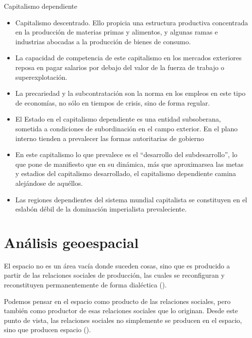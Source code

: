 \documentclass[
  letterpaper,
  DIV=11,
  numbers=noendperiod]{scrreprt}
\begin{document}
Capitalismo dependiente

\begin{itemize}
\item
  Capitalismo descentrado. Ello propicia una estructura productiva
  concentrada en la producción de materias primas y alimentos, y algunas
  ramas e industrias abocadas a la producción de bienes de consumo.
\item
  La capacidad de competencia de este capitalismo en los mercados
  exteriores reposa en pagar salarios por debajo del valor de la fuerza
  de trabajo o superexplotación.
\item
  La precariedad y la subcontratación son la norma en los empleos en
  este tipo de economías, no sólo en tiempos de crisis, sino de forma
  regular.
\item
  El Estado en el capitalismo dependiente es una entidad subsoberana,
  sometida a condiciones de subordinación en el campo exterior. En el
  plano interno tienden a prevalecer las formas autoritarias de gobierno
\item
  En este capitalismo lo que prevalece es el ``desarrollo del
  subdesarrollo'', lo que pone de manifiesto que en su dinámica, más que
  aproximarsea las metas y estadios del capitalismo desarrollado, el
  capitalismo dependiente camina alejándose de aquéllos.
\item
  Las regiones dependientes del sistema mundial capitalista se
  constituyen en el eslabón débil de la dominación imperialista
  prevaleciente.
\end{itemize}

\chapter{Análisis geoespacial}\label{anuxe1lisis-geoespacial}

El espacio no es un área vacía donde suceden cosas, sino que es
producido a partir de las relaciones sociales de producción, las cuales
se reconfiguran y reconstituyen permanentemente de forma dialéctica
().

Podemos pensar en el espacio como producto de las relaciones sociales,
pero también como productor de esas relaciones sociales que lo originan.
Desde este punto de vista, las relaciones sociales no simplemente se
producen en el espacio, sino que producen espacio
().
\end{document}
